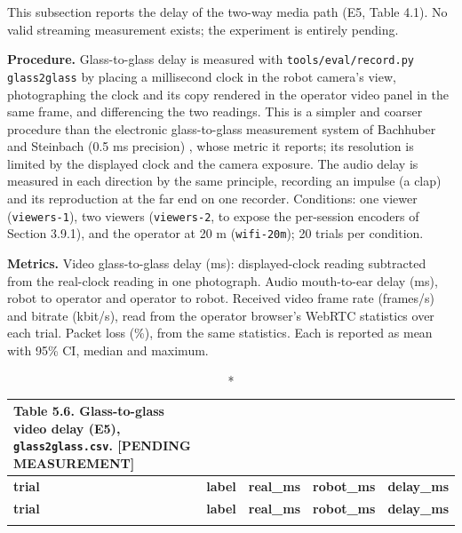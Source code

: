This subsection reports the delay of the two-way media path (E5, Table 4.1). No valid streaming measurement exists; the experiment is entirely pending.

\textbf{Procedure.} Glass-to-glass delay is measured with \texttt{tools/eval/record.py glass2glass} by placing a millisecond clock in the robot camera's view, photographing the clock and its copy rendered in the operator video panel in the same frame, and differencing the two readings. This is a simpler and coarser procedure than the electronic glass-to-glass measurement system of Bachhuber and Steinbach (0.5 ms precision) \cite{bachhuber2016}, whose metric it reports; its resolution is limited by the displayed clock and the camera exposure. The audio delay is measured in each direction by the same principle, recording an impulse (a clap) and its reproduction at the far end on one recorder. Conditions: one viewer (\texttt{viewers-1}), two viewers (\texttt{viewers-2}, to expose the per-session encoders of Section 3.9.1), and the operator at 20 m (\texttt{wifi-20m}); 20 trials per condition.

\textbf{Metrics.} Video glass-to-glass delay (ms): displayed-clock reading subtracted from the real-clock reading in one photograph. Audio mouth-to-ear delay (ms), robot to operator and operator to robot. Received video frame rate (frames/s) and bitrate (kbit/s), read from the operator browser's WebRTC statistics over each trial. Packet loss (\%), from the same statistics. Each is reported as mean with 95\% CI, median and maximum.

\begin{center}
\begin{longtable}{|l|l|l|l|l|}
\caption*{Table 5.6. Glass-to-glass video delay (E5), \texttt{glass2glass.csv}. [PENDING MEASUREMENT]}
\addcontentsline{lot}{table}{\protect\numberline{5.6}Glass-to-glass video delay (E5), \texttt{glass2glass.csv}. [PENDING MEASUREMENT]}
\\
\hline
\textbf{trial} & \textbf{label} & \textbf{real\_ms} & \textbf{robot\_ms} & \textbf{delay\_ms} \\
\hline
\endfirsthead
\hline
\textbf{trial} & \textbf{label} & \textbf{real\_ms} & \textbf{robot\_ms} & \textbf{delay\_ms} \\
\hline
\endhead
 & & & & \\
\hline
\end{longtable}
\end{center}

